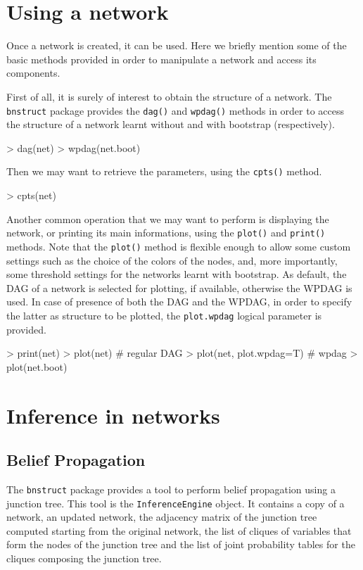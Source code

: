 \documentclass{article}
\newcommand{\Robject}[1]{{\texttt{#1}}}
\newcommand{\Rpackage}[1]{{\texttt{#1}}}
\newcommand{\Rmethod}[1]{{\texttt{#1}}}
\newcommand{\Rfunarg}[1]{{\texttt{#1}}}
\begin{document}
\section{Using a network}
Once a network is created, it can be used. Here we briefly mention some of the basic methods provided in order to
manipulate a network and access its components.

First of all, it is surely of interest to obtain the structure of a network. The \Rpackage{bnstruct} package
provides the \Rmethod{dag()} and \Rmethod{wpdag()} methods in order to access the structure of a network learnt without and
with bootstrap (respectively).
\begin{Schunk}
\begin{Sinput}
> dag(net)
> wpdag(net.boot)
\end{Sinput}
\end{Schunk}

Then we may want to retrieve the parameters, using the \Rmethod{cpts()} method.
\begin{Schunk}
\begin{Sinput}
> cpts(net)
\end{Sinput}
\end{Schunk}

Another common operation that we may want to perform is displaying the network, or printing its main informations, using the
\Rmethod{plot()} and \Rmethod{print()} methods. Note that the \Rmethod{plot()} method is flexible enough to allow 
some custom settings such as the choice of the colors of the nodes, and, more importantly, some threshold settings 
for the networks learnt with bootstrap. As default, the DAG of a network is selected for plotting, if available,
otherwise the WPDAG is used. In case of presence of both the DAG and the WPDAG, in order to specify the latter as
structure to be plotted, the \Rfunarg{plot.wpdag} logical parameter is provided.
\begin{Schunk}
\begin{Sinput}
> print(net)
> plot(net) # regular DAG
> plot(net, plot.wpdag=T) # wpdag
> plot(net.boot)
\end{Sinput}
\end{Schunk}

\section{Inference in networks}
\subsection{Belief Propagation}
The \Rpackage{bnstruct} package provides a tool to perform belief propagation using a junction tree.
This tool is the \Robject{InferenceEngine} object.
It contains a copy of a network, an updated network, the adjacency matrix of the junction tree computed
starting from the original network, the list of cliques of variables that form the nodes of the junction tree
and the list of joint probability tables for the cliques composing the junction tree.
\end{document}
